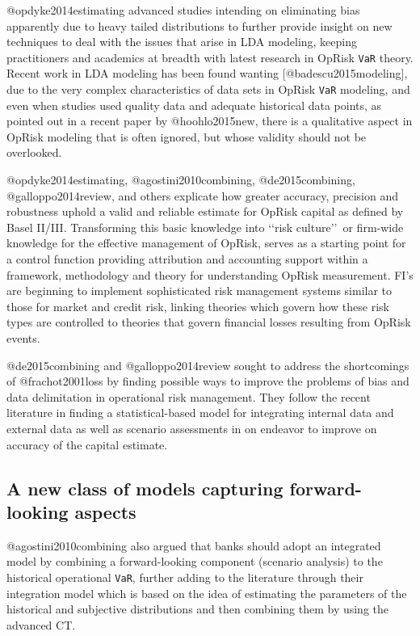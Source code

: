 \documentclass[]{article}
\begin{document}
@opdyke2014estimating advanced studies intending on eliminating bias
apparently due to heavy tailed distributions to further provide insight
on new techniques to deal with the issues that arise in LDA modeling,
keeping practitioners and academics at breadth with latest research in
OpRisk \texttt{VaR} theory. Recent work in LDA modeling has been found
wanting {[}@badescu2015modeling{]}, due to the very complex
characteristics of data sets in OpRisk \texttt{VaR} modeling, and even
when studies used quality data and adequate historical data points, as
pointed out in a recent paper by @hoohlo2015new, there is a qualitative
aspect in OpRisk modeling that is often ignored, but whose validity
should not be overlooked. \medskip

@opdyke2014estimating, @agostini2010combining, @de2015combining,
@galloppo2014review, and others explicate how greater accuracy,
precision and robustness uphold a valid and reliable estimate for OpRisk
capital as defined by Basel II/III. Transforming this basic knowledge
into \lq\lq risk culture\rq\rq~or firm-wide knowledge for the effective
management of OpRisk, serves as a starting point for a control function
providing attribution and accounting support within a framework,
methodology and theory for understanding OpRisk measurement. FI's are
beginning to implement sophisticated risk management systems similar to
those for market and credit risk, linking theories which govern how
these risk types are controlled to theories that govern financial losses
resulting from OpRisk events. \medskip

@de2015combining and @galloppo2014review sought to address the
shortcomings of @frachot2001loss by finding possible ways to improve the
problems of bias and data delimitation in operational risk management.
They follow the recent literature in finding a statistical-based model
for integrating internal data and external data as well as scenario
assessments in on endeavor to improve on accuracy of the capital
estimate.

\subsection{A new class of models capturing forward-looking aspects}
\label{ssec:A new class of models capturing forward-looking aspects}

@agostini2010combining also argued that banks should adopt an integrated
model by combining a forward-looking component (scenario analysis) to
the historical operational \texttt{VaR}, further adding to the
literature through their integration model which is based on the idea of
estimating the parameters of the historical and subjective distributions
and then combining them by using the advanced CT. \medskip
\end{document}
